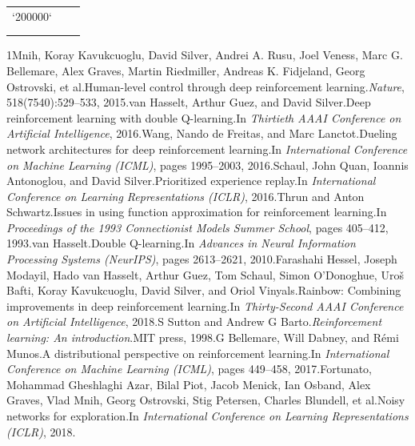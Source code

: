 \documentclass[conference]{IEEEtran}
\begin{document}
\begin{table}[ht]
\begin{tabular}{|l|l|l|}
`200000`\\\\\n\hline\n\end{tabular}\n\label{tab:hyperparameters}\n\end{table}\n\n\begin{thebibliography}{1}\n\n{}\nVolodymyr Mnih, Koray Kavukcuoglu, David Silver, Andrei A. Rusu, Joel Veness, Marc G. Bellemare, Alex Graves, Martin Riedmiller, Andreas K. Fidjeland, Georg Ostrovski, et al.\n\newblock Human-level control through deep reinforcement learning.\n\newblock \emph{Nature}, 518(7540):529--533, 2015.\n\n{}\nHado van Hasselt, Arthur Guez, and David Silver.\n\newblock Deep reinforcement learning with double Q-learning.\n\newblock In \emph{Thirtieth AAAI Conference on Artificial Intelligence}, 2016.\n\n{}\nZiyu Wang, Nando de Freitas, and Marc Lanctot.\n\newblock Dueling network architectures for deep reinforcement learning.\n\newblock In \emph{International Conference on Machine Learning (ICML)}, pages 1995--2003, 2016.\n\n{}\nTom Schaul, John Quan, Ioannis Antonoglou, and David Silver.\n\newblock Prioritized experience replay.\n\newblock In \emph{International Conference on Learning Representations (ICLR)}, 2016.\n\n{}\nSebastian Thrun and Anton Schwartz.\n\newblock Issues in using function approximation for reinforcement learning.\n\newblock In \emph{Proceedings of the 1993 Connectionist Models Summer School}, pages 405--412, 1993.\n\n{}\nHado van Hasselt.\n\newblock Double Q-learning.\n\newblock In \emph{Advances in Neural Information Processing Systems (NeurIPS)}, pages 2613--2621, 2010.\n\n{}\nMana Farashahi Hessel, Joseph Modayil, Hado van Hasselt, Arthur Guez, Tom Schaul, Simon O’Donoghue, Uro{\v s} Bafti, Koray Kavukcuoglu, David Silver, and Oriol Vinyals.\n\newblock Rainbow: Combining improvements in deep reinforcement learning.\n\newblock In \emph{Thirty-Second AAAI Conference on Artificial Intelligence}, 2018.\n\n{}\nRichard S Sutton and Andrew G Barto.\n\newblock \emph{Reinforcement learning: An introduction}.\n\newblock MIT press, 1998.\n\n{}\nMarc G Bellemare, Will Dabney, and Rémi Munos.\n\newblock A distributional perspective on reinforcement learning.\n\newblock In \emph{International Conference on Machine Learning (ICML)}, pages 449--458, 2017.\n\n{}\nMeire Fortunato, Mohammad Gheshlaghi Azar, Bilal Piot, Jacob Menick, Ian Osband, Alex Graves, Vlad Mnih, Georg Ostrovski, Stig Petersen, Charles Blundell, et al.\n\newblock Noisy networks for exploration.\n\newblock In \emph{International Conference on Learning Representations (ICLR)}, 2018.\n\n\n\n\n\end{thebibliography}\n\n\n
\end{document}
